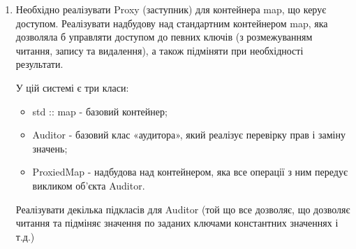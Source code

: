 \documentclass[a5paper,titlepage,openany,twoside,
]
{book_unv}%
\begin{document}
\begin{enumerate}
\begin{enumerate}
\begin{enumerate}
Для задання пробілів у рядках можна використати лапки:
\begin{verbatim}
name " Vasya Pupkin "   # пробіли на початку та в кінці рядку
spaces '     '  # тут 5 пробілів
\end{verbatim}
Рядки, що містять ' та ", записуються так:
\begin{verbatim}
double_quote   '"'
single_quote "'"
both_quotes "'\""
\end{verbatim}
Обернена коса лінія \ має роль escape-символу (аналогічно C) та дозволяє задавати наступні спецсимволи
 (всередині лапок "…" або '…'):
\begin{verbatim}
    \' – одиночні лапки;
    \" – подвійні лапки;
    \n – символ переводу рядку (ASCII-код 10);
    \t – символ табуляції (ASCII-код 9).
    \\ — символ бекслешу.
\end{verbatim}
Реалізувати функцію:

map<string, string> readConfiguration(istream \&is,
                                      string *perrors = nullptr);

яка б читала конфігураційний файл з вхідного потоку і повертала його значення як відображення (map).

Помилки, пов'язані з неправильним синтаксисом, потрібно повертати в рядку за вказівником perrors (якщо він ненульовий). 
При цьому функція все ж повинна повернути те, що змогла розпізнати в файлі.
Для функції повинен бути створений повноцінний набір тестів, що охоплює всі синтаксичні можливості конфігураційних файлів. Для тестів зручно користуватися istringstream, щоб задавати вхідні файли прямо в рядках. 


\item
Необхідно реалізувати Proxy (заступник) для контейнера map, що керує доступом.
Реалізувати надбудову над стандартним контейнером map, яка дозволяла б управляти доступом до певних ключів 
(з розмежуванням читання, запису та видалення), а також підміняти при необхідності результати.

У цій системі є три класи:
\begin{itemize}
\item
    std :: map - базовий контейнер;
\item
    Auditor - базовий клас «аудитора», який реалізує перевірку прав і заміну значень;
\item
    ProxiedMap - надбудова над контейнером, яка все операції з ним передує викликом об'єкта Auditor.
\end{itemize}
Реалізувати декілька підкласів для Auditor (той що все дозволяє, що дозволяє читання та підміняє значення по заданих ключами 
константних значеннях і т.д.)


\end{enumerate}
\end{enumerate}
\end{enumerate}
\end{document}
